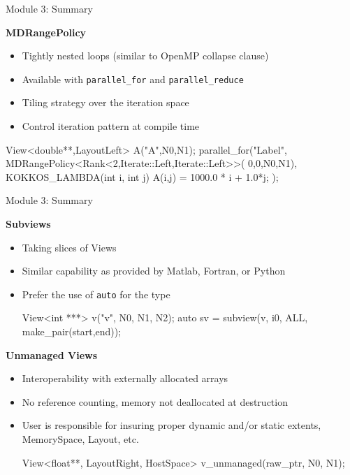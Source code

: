 \begin{frame}[fragile]{Module 3: Summary}

	\textbf{MDRangePolicy}
        \begin{itemize}
                \item Tightly nested loops (similar to OpenMP collapse clause)
                \item Available with \texttt{parallel\_for} and \texttt{parallel\_reduce}
                \item Tiling strategy over the iteration space
                \item Control iteration pattern at compile time
        \end{itemize}

\begin{code}[keywords={double,Iterate,Left,Right,int,MDRangePolicy,Rank}]
View<double**,LayoutLeft> A("A",N0,N1);
parallel_for("Label",
  MDRangePolicy<Rank<2,Iterate::Left,Iterate::Left>>(
	{0,0},{N0,N1}),
  KOKKOS_LAMBDA(int i, int j) {
    A(i,j) = 1000.0 * i + 1.0*j;
});
\end{code}

\end{frame}

\begin{frame}[fragile]{Module 3: Summary}

	\textbf{Subviews}
        \begin{itemize}
                \item Taking slices of Views
                \item Similar capability as provided by Matlab, Fortran, or Python
                \item {Prefer the use of \texttt{auto} for the type
\begin{code}[keywords={View,int,subview,ALL,make_pair}]
View<int ***> v("v", N0, N1, N2);
auto sv = subview(v, i0, ALL, make_pair(start,end));
\end{code}}
        \end{itemize}

        \vspace{10pt}
        \textbf{Unmanaged Views}
        \begin{itemize}
                \item Interoperability with externally allocated arrays
                \item No reference counting, memory not deallocated at destruction
                \item { User is responsible for insuring proper dynamic and/or static extents, MemorySpace, Layout, etc.
\begin{code}[keywords={View, float, LayoutRight, HostSpace, MemoryTraits, Unmanaged}]
View<float**, LayoutRight, HostSpace>
  v_unmanaged(raw_ptr, N0, N1);
\end{code}}
        \end{itemize}

\end{frame}

